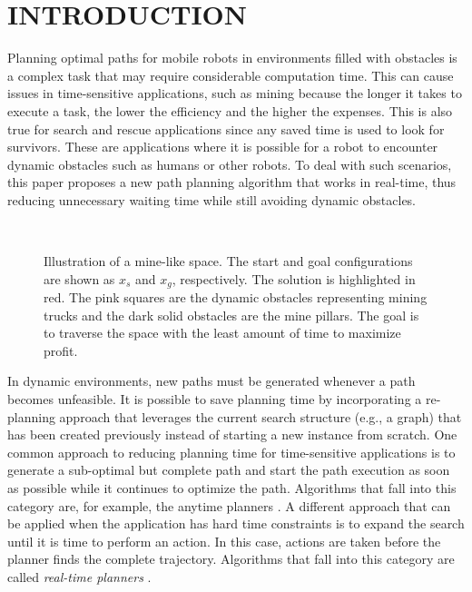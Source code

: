 \section{INTRODUCTION}

Planning optimal paths for mobile robots in environments filled with obstacles is a complex task that may require considerable computation time.  This can cause issues in time-sensitive applications, such as mining \cite{tian2021trajectory} because the longer it takes to execute a task, the lower the efficiency and the higher the expenses. This is also true for search and rescue applications\cite{hayat2020multi} since any saved time is used to look for survivors. These are applications where it is possible for a robot to encounter dynamic obstacles such as humans or other robots. To deal with such scenarios, this paper proposes a new path planning algorithm that works in real-time, thus reducing unnecessary waiting time while still avoiding dynamic obstacles.





\begin{figure}
\centerline{
\\
}
\caption{Illustration of a mine-like space. The start and goal configurations are shown as $x_s$ and $x_g$, respectively. The solution is highlighted in red. The pink squares are the dynamic obstacles representing mining trucks and the dark solid obstacles are the mine pillars. The goal is to traverse the space with the least amount of time to maximize profit.}
\label{fig:mine}
\end{figure}

In dynamic environments, new paths must be generated whenever a path becomes unfeasible. It is possible to save planning time by incorporating a re-planning approach that leverages the current search structure (e.g., a graph) that has been created previously instead of starting a new instance from scratch. One common approach to reducing planning time for time-sensitive applications %
is to generate a sub-optimal but complete path and start the path execution as soon as possible while it continues to optimize the path. Algorithms that fall into this category are, for example, the anytime planners \cite{karaman2011anytime, xu2020informed}. A different approach that can be applied when the application has hard time constraints is to expand the search until it is time to perform an action. In this case, actions are taken before the planner finds the complete trajectory. Algorithms that fall into this category are called \emph{real-time planners} \cite{naderi2015rt}.

